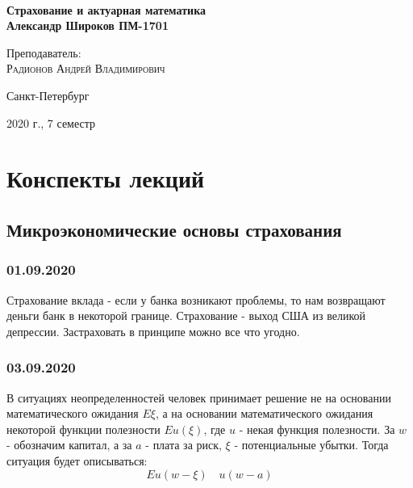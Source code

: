 \documentclass[%
12pt, %
final, %
oneside, %
onecolumn, %
centertags]{article} %
\theoremstyle{plain}
\theoremstyle{definition}
\theoremstyle{remark}
\begin{document}
\begin{titlepage} 
\begin{center}
\textbf{}\\[10.0cm]
\textbf{\LARGE Страхование и актуарная математика}\\[0.5cm]
\textbf{\Large Александр Широков ПМ-1701} \\[0.2cm]


\begin{center} \large
{Преподаватель:} \\[0.5cm]
\textsc {Радионов Андрей Владимирович}\\
\end{center}

\vfill 



{\large {Санкт-Петербург}} \par
{\large {2020 г., 7 семестр}}
\end{center} 
\end{titlepage}

\begin{thebibliography}{3}
\end{thebibliography}
\tableofcontents
\newpage

\section{Конспекты лекций}

\subsection{Микроэкономические основы страхования}

\subsubsection{01.09.2020}

Страхование вклада - если у банка возникают проблемы, то нам возвращают деньги банк в некоторой границе. Страхование - выход США из великой депрессии. Застраховать в принципе можно все что угодно.

\subsubsection{03.09.2020}

В ситуациях неопределенностей человек принимает решение не на основании математического ожидания $E\xi$, а на основании математического ожидания некоторой функции полезности $Eu(\xi)$, где $u$ - некая функция полезности. За $w$ - обозначим капитал, а за $a$ - плата за риск, $\xi$ - потенциальные убытки. Тогда ситуация будет описываться:
$$Eu(w-\xi) \quad u(w-a)$$
\end{document}
